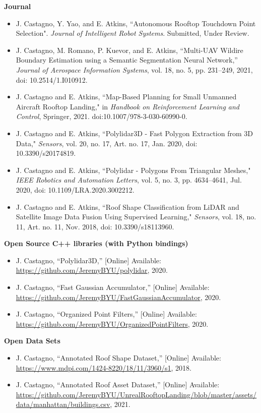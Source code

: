 \vspace{1.5cm}

\textbf{Journal}

\vspace{0.20cm}
\begin{itemize}[noitemsep]
    \item J. Castagno, Y. Yao, and E. Atkins, ``Autonomous Rooftop Touchdown Point Selection". \emph{Journal of Intelligent Robot Systems}. Submitted, Under Review. 
    \item J. Castagno, M. Romano, P. Kuevor, and E. Atkins, ``Multi-UAV Wildire Boundary Estimation using a Semantic Segmentation Neural Network,” \emph{Journal of Aerospace Information Systems}, vol. 18, no. 5, pp. 231–249, 2021, doi: 10.2514/1.I010912.
    \item J. Castagno and E. Atkins, ``Map-Based Planning for Small Unmanned Aircraft Rooftop Landing," in \emph{Handbook on Reinforcement Learning and Control}, Springer, 2021. doi:10.1007/978-3-030-60990-0.
    \item J. Castagno and E. Atkins, “Polylidar3D - Fast Polygon Extraction from 3D Data," \emph{Sensors}, vol. 20, no. 17, Art. no. 17, Jan. 2020, doi: 10.3390/s20174819.
    \item J. Castagno and E. Atkins, “Polylidar - Polygons From Triangular Meshes," \emph{IEEE Robotics and Automation Letters}, vol. 5, no. 3, {\small pp. 4634–4641,  Jul. 2020, doi:  10.1109/LRA.2020.3002212.}
    \item J. Castagno and E. Atkins, “Roof Shape Classification from LiDAR and Satellite Image Data Fusion Using Supervised Learning," \emph{Sensors}, vol. 18, no. 11, Art. no. 11, Nov. 2018, doi: 10.3390/s18113960.
\end{itemize}

\textbf{Open Source C++ libraries (with Python bindings)}

\begin{itemize}[noitemsep]
    \item J. Castagno, ``Polylidar3D,''   [Online]  Available: \url{https://github.com/JeremyBYU/polylidar}, 2020.
    \item J. Castagno, ``Fast Gaussian Accumulator,''   [Online]  Available: \url{https://github.com/JeremyBYU/FastGaussianAccumulator}, 2020.
    \item J. Castagno, ``Organized Point Filters,''   [Online]  Available: \url{https://github.com/JeremyBYU/OrganizedPointFilters}, 2020.
\end{itemize}

\textbf{Open Data Sets}

\begin{itemize}[noitemsep]
    \item J. Castagno, ``Annotated Roof Shape Dataset,''   [Online]  Available: \url{https://www.mdpi.com/1424-8220/18/11/3960/s1}, 2018.
    \item J. Castagno, ``Annotated Roof Asset Dataset,'' [Online] Available: \url{https://github.com/JeremyBYU/UnrealRooftopLanding/blob/master/assets/data/manhattan/buildings.csv}, 2021.
\end{itemize}
